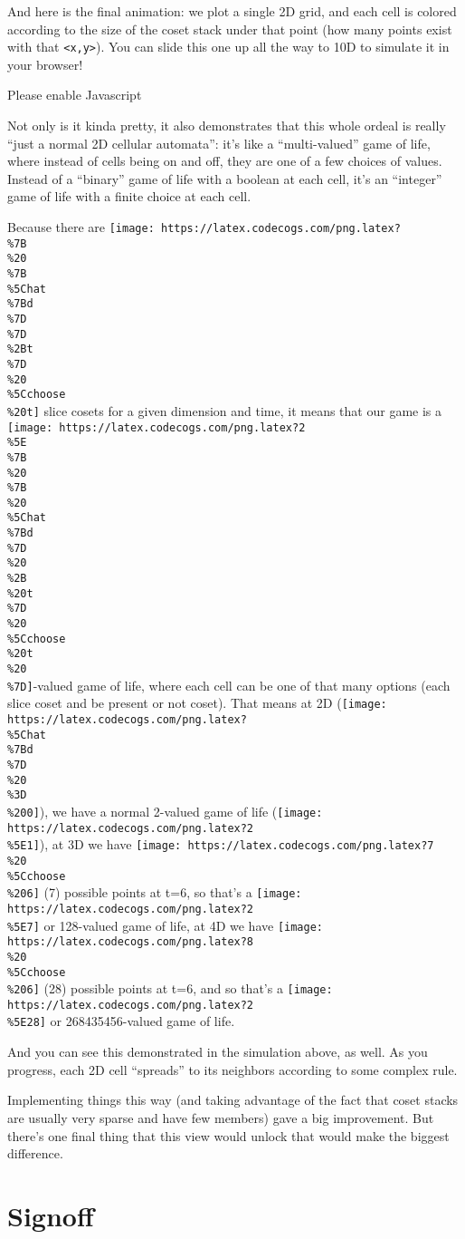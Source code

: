 \documentclass[]{article}
\begin{document}
And here is the final animation: we plot a single 2D grid, and each cell is
colored according to the size of the coset stack under that point (how many
points exist with that \texttt{\textless{}x,y\textgreater{}}). You can slide
this one up all the way to 10D to simulate it in your browser!

\leavevmode\hypertarget{golFlat}{}%
Please enable Javascript

Not only is it kinda pretty, it also demonstrates that this whole ordeal is
really ``just a normal 2D cellular automata'': it's like a ``multi-valued'' game
of life, where instead of cells being on and off, they are one of a few choices
of values. Instead of a ``binary'' game of life with a boolean at each cell,
it's an ``integer'' game of life with a finite choice at each cell.

Because there are
\texttt{[image: https://latex.codecogs.com/png.latex?\\\%7B\\\%20\\\%7B\\\%5Chat\\\%7Bd\\\%7D\\\%7D\\\%2Bt\\\%7D\\\%20\\\%5Cchoose\\\%20t]}
slice cosets for a given dimension and time, it means that our game is a
\texttt{[image: https://latex.codecogs.com/png.latex?2\\\%5E\\\%7B\\\%20\\\%7B\\\%20\\\%5Chat\\\%7Bd\\\%7D\\\%20\\\%2B\\\%20t\\\%7D\\\%20\\\%5Cchoose\\\%20t\\\%20\\\%7D]}-valued
game of life, where each cell can be one of that many options (each slice coset
and be present or not coset). That means at 2D
(\texttt{[image: https://latex.codecogs.com/png.latex?\\\%5Chat\\\%7Bd\\\%7D\\\%20\\\%3D\\\%200]}),
we have a normal 2-valued game of life
(\texttt{[image: https://latex.codecogs.com/png.latex?2\\\%5E1]}), at 3D we have
\texttt{[image: https://latex.codecogs.com/png.latex?7\\\%20\\\%5Cchoose\\\%206]} (7)
possible points at t=6, so that's a
\texttt{[image: https://latex.codecogs.com/png.latex?2\\\%5E7]} or 128-valued game
of life, at 4D we have
\texttt{[image: https://latex.codecogs.com/png.latex?8\\\%20\\\%5Cchoose\\\%206]} (28)
possible points at t=6, and so that's a
\texttt{[image: https://latex.codecogs.com/png.latex?2\\\%5E28]} or
268435456-valued game of life.

And you can see this demonstrated in the simulation above, as well. As you
progress, each 2D cell ``spreads'' to its neighbors according to some complex
rule.

Implementing things this way (and taking advantage of the fact that coset stacks
are usually very sparse and have few members) gave a big improvement. But
there's one final thing that this view would unlock that would make the biggest
difference.

\hypertarget{signoff}{%
\section{Signoff}\label{signoff}}
\end{document}
